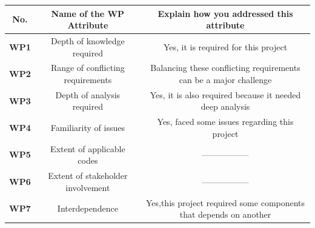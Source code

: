 \documentclass{report}
\begin{document}
  \vspace{0.6 cm}
  \centering
  \begin{tabular}{|c|c|c|}\hline
      \textbf{No.} &\textbf{Name of the WP Attribute} & \textbf{Explain how you addressed this attribute}\\ \hline
       \textbf{WP1} & {Depth of knowledge required} & {Yes, it is required for this project} \\ \hline
       \textbf{WP2}& {Range of conflicting requirements} & {Balancing these conflicting requirements can be a major challenge}\\ \hline
       \textbf{WP3} & {Depth of analysis required} & {Yes, it is also required because it needed deep analysis} \\ \hline
       \textbf{WP4}& {Familiarity of issues} & {Yes, faced some issues regarding this project}\\ \hline
       \textbf{WP5} & {Extent of applicable codes} & { -----------------} \\ \hline
       \textbf{WP6}& {Extent of stakeholder involvement } & { ----------------- }\\ \hline
       \textbf{WP7} & {Interdependence} & {Yes,this project required some components that depends on another} \\ \hline
       
  \end{tabular}

\printbibliography
\end{document}
